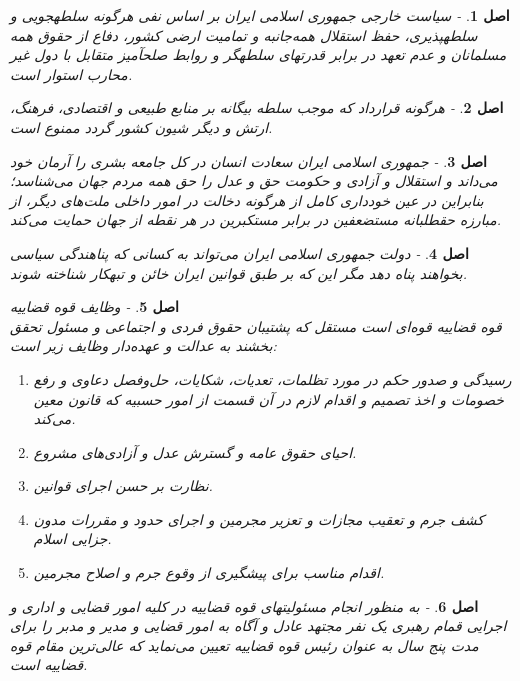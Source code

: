 \documentclass[12pt]{article}
\newtheorem{asl}{اصل}
\begin{document}
\begin{asl}- 
سیاست خارجی جمهوری اسلامی ایران بر اساس نفی هرگونه سلطه‏جویی و سلطه‏پذیری، حفظ استقلال همه‌جانبه و تمامیت ارضی کشور، دفاع از حقوق همه مسلمانان و عدم تعهد در برابر قدرت‏های سلطه‏گر و روابط صلح‏آمیز متقابل با دول غیر محارب استوار است.  
\end{asl}

\begin{asl}- 
هرگونه قرارداد که موجب سلطه بیگانه بر منابع طبیعی و اقتصادی، فرهنگ، ارتش و دیگر شیون کشور گردد ممنوع است.  
\end{asl}

\begin{asl}- 
جمهوری اسلامی ایران سعادت انسان در کل جامعه بشری را آرمان خود می‌داند و استقلال و آزادی و حکومت حق و عدل را حق همه مردم جهان می‌شناسد؛ بنابراین در عین خودداری کامل از هرگونه دخالت در امور داخلی ملت‌های دیگر، از مبارزه حق‏طلبانه مستضعفین در برابر مستکبرین در هر نقطه از جهان حمایت می‌کند.  
\end{asl}

\begin{asl}- 
دولت جمهوری اسلامی ایران می‌تواند به کسانی که پناهندگی سیاسی بخواهند پناه دهد مگر این که بر طبق قوانین ایران خائن و تبهکار شناخته شوند. 
\end{asl}

\begin{asl}- 
وظایف قوه قضاییه 
\\
قوه قضاییه قوه‌ای است مستقل که پشتیبان حقوق فردی و اجتماعی و مسئول تحقق بخشند به عدالت و عهده‌دار وظایف زیر است‏: 
\begin{enumerate}
	\item 
	رسیدگی و صدور حکم در مورد تظلمات، تعدیات، شکایات، حل‌وفصل دعاوی و رفع خصومات و اخذ تصمیم و اقدام لازم در آن قسمت از امور حسبیه که قانون معین می‌کند. 
	\item
	احیای حقوق عامه و گسترش عدل و آزادی‌های مشروع.
	\item
	نظارت بر حسن اجرای قوانین.
	\item
	کشف جرم و تعقیب مجازات و تعزیر مجرمین و اجرای حدود و مقررات مدون جزایی اسلام.
	\item
	اقدام مناسب برای پیشگیری از وقوع جرم و اصلاح مجرمین. 
\end{enumerate}
\end{asl}

\begin{asl}- 
به منظور انجام مسئولیت‏های قوه قضاییه در کلیه امور قضایی و اداری و اجرایی قمام رهبری یک نفر مجتهد عادل و آگاه به امور قضایی و مدیر و مدبر را برای مدت پنج سال به عنوان رئیس قوه قضاییه تعیین می‌نماید که عالی‌ترین مقام قوه قضاییه است. 
\end{asl}
\end{document}
